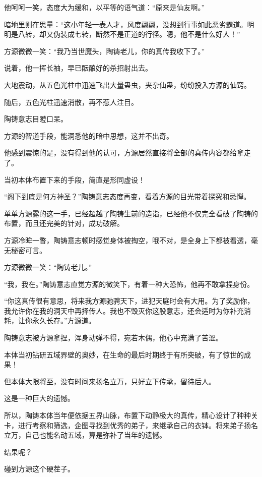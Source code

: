 \begin{this_body}
他呵呵一笑，态度大为缓和，以平等的语气道：“原来是仙友啊。”

暗地里则在思量：“这小年轻一表人才，风度翩翩，没想到行事如此恶劣霸道。明明是八转，却又伪装成七转，断然不是正道的行径。嗯，他不是什么好人！”

方源微微一笑：“我乃当世魔头，陶铸老儿，你的真传我收下了。”

说着，他一挥长袖，早已酝酿好的杀招射出去。

大地震动，从五色光柱中迅速飞出大量蛊虫，夹杂仙蛊，纷纷投入方源的仙窍。

随后，五色光柱迅速消散，再不惹人注目。

陶铸意志目瞪口呆。

方源的智道手段，能洞悉他的暗中思想，这并不出奇。

他感到震惊的是，没有得到他的认可，方源居然直接将全部的真传内容都给拿走了。

当初本体布置下来的手段，简直是形同虚设！

“阁下到底是何方神圣？”陶铸意志态度再变，看着方源的目光带着探究和忌惮。

单单方源露的这一手，已经超越了陶铸生前的造诣，已经他不仅完全看破了陶铸的布置，而且还完美的针对，成功破解。

方源冷眸一瞥，陶铸意志顿时感觉身体被掏空，哦不对，是全身上下都被看透，毫无秘密可言。

方源微微一笑：“陶铸老儿。”

“我，我在。”陶铸意志直觉方源的微笑下，有着一种大恐怖，他再不敢拿捏身份。

“你这真传很有意思，将来我方源驰骋天下，进犯天庭时会有大用。为了奖励你，我允许你在我的洞天中再择传人。我也不毁灭你这股意志，还会适时为你补充消耗，让你永久长存。”方源道。

陶铸意志被方源拿捏，浑身动弹不得，宛若木偶，他心中充满了苦涩。

本体当初钻研五域界壁的奥妙，在生命的最后时期终于有所突破，有了惊世的成果！

但本体大限将至，没有时间来扬名立万，只好立下传承，留待后人。

这是一种巨大的遗憾。

所以，陶铸本体当年便依据五界山脉，布置下动静极大的真传，精心设计了种种关卡，进行考察和筛选，企图寻找到优秀的弟子，来继承自己的衣钵。将来弟子扬名立万，自己也能名动五域，算是弥补了当年的遗憾。

结果呢？

碰到方源这个硬茬子。


\end{this_body}
